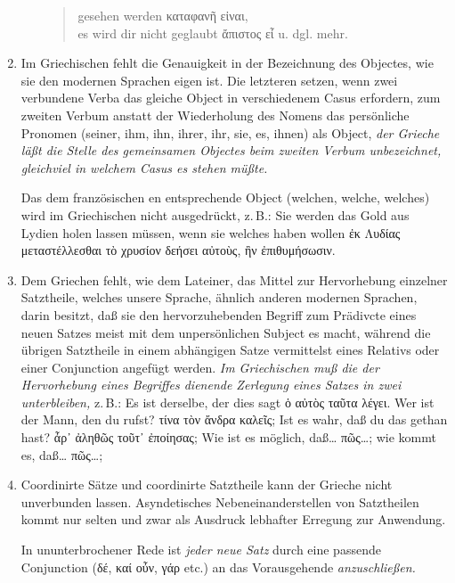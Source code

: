 \begin{enumerate}[leftmargin=0pt,rightmargin=0pt,listparindent =1cm,labelindent=1cm,labelsep=1ex,labelwidth={*},itemindent={*},align=left]
\begin{enumerate}
\begin{quote}
gesehen werden \textgreek[variant=ancient]{καταφανῆ εἰναι},\\
es wird dir nicht geglaubt \textgreek[variant=ancient]{ἄπιστος εἶ}
u. dgl. mehr.
\end{quote}
\end{enumerate}
\item Im Griechischen fehlt die Genauigkeit in der Bezeichnung des Objectes,
wie sie den modernen Sprachen eigen ist. Die letzteren setzen, wenn
zwei verbundene Verba das gleiche Object in verschiedenem Casus erfordern,
zum zweiten Verbum anstatt der Wiederholung des Nomens das persönliche
Pronomen (seiner, ihm, ihn, ihrer, ihr, sie, es, ihnen) als Object,
\emph{der Grieche läßt die Stelle des gemeinsamen Objectes beim zweiten
Verbum unbezeichnet, gleichviel in welchem Casus es stehen müßte.}


Das dem französischen \textfrench{en} entsprechende Object (welchen,
welche, welches) wird im Griechischen nicht aus\textcompwordmark{}gedrückt,
z.\,B.: Sie werden das Gold aus Lydien holen lassen müssen, wenn
sie welches haben wollen \textgreek[variant=ancient]{ἐκ Λυδίας μεταστέλλεσθαι
τὸ χρυσίον δεήσει αὐτοὺς, ἢν ἐπιθυμήσωσιν.}

\item Dem Griechen fehlt, wie dem Lateiner, das Mittel zur Hervorhebung
einzelner Satztheile, welches unsere Sprache, ähnlich anderen modernen
Sprachen, darin besitzt, daß sie den hervorzuhebenden Begriff zum
Prädivcte eines neuen Satzes meist mit dem unpersönlichen Subject
es macht, während die übrigen Satztheile in einem abhängigen Satze
vermittelst eines Relativs oder einer Conjunction angefügt werden.
\emph{Im Griechischen muß die der Hervorhebung eines Begriffes dienende
Zerlegung eines Satzes in zwei unterbleiben,} z.\,B.:  Es ist derselbe,
der dies sagt \textgreek[variant=ancient]{ὁ αὐτὸς ταῦτα λέγει}. Wer
ist der Mann, den du rufst? \textgreek[variant=ancient]{τίνα τὸν ἄνδρα
καλεῖς;} Ist es wahr, daß du das gethan hast? \textgreek[variant=ancient]{ἆρ᾽
ἀληθῶς τοῦτ᾽ ἐποίησας;} Wie ist es möglich, daß\ldots{} \textgreek[variant=ancient]{πῶς\ldots{};}
wie kommt es, daß\ldots{} \textgreek[variant=ancient]{πῶς\ldots{}; }
\item Coordinirte Sätze und coordinirte Satztheile kann der Grieche nicht
unverbunden lassen. Asyndetisches Nebeneinanderstellen von Satztheilen
kommt nur selten und zwar als Aus\textcompwordmark{}druck lebhafter
Erregung zur Anwendung.


In ununterbrochener Rede ist \emph{jeder neue Satz} durch eine passende
Conjunction (\textgreek[variant=ancient]{δέ, καί οὖν, γάρ} etc.) an
das Voraus\textcompwordmark{}gehende \emph{anzuschließen.}



\end{enumerate}
